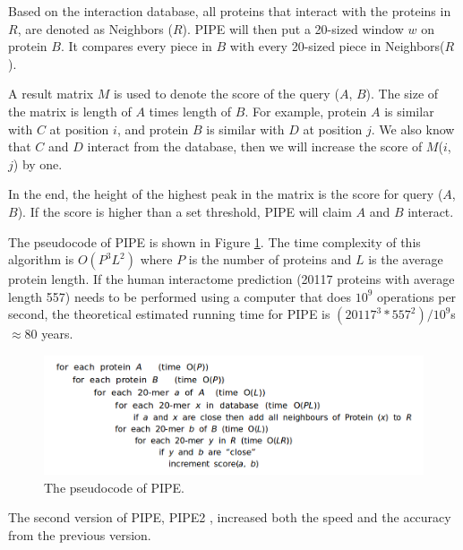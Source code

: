 Based on the interaction database, all proteins that interact with the proteins in $R$, are denoted as Neighbors ($R$). PIPE will then put a 20-sized window $w$ on protein $B$. It compares every piece in $B$ with every 20-sized piece in Neighbors($R$).

A result matrix $M$ is used to denote the score of the query ($A$, $B$). The size of the matrix is length of $A$ times length of $B$. For example, protein $A$ is similar with $C$ at position $i$, and protein $B$ is similar with $D$ at position $j$. We also know that $C$ and $D$ interact from the database, then we will increase the score of $M$($i$, $j$) by one.

In the end, the height of the highest peak in the matrix is the score for query ($A$, $B$). If the score is higher than a set threshold, PIPE will claim $A$ and $B$ interact.

The pseudocode of PIPE is shown in Figure \ref{fig_pseudocode_pipe}. The time complexity of this algorithm is $O(P^3L^2)$ where $P$ is the number of proteins and $L$ is the average protein length. If the human interactome prediction (20117 proteins with average length 557) needs to be performed using a computer that does $10^9$ operations per second, the theoretical estimated running time for PIPE is $(20117^3*557^2)/10^9$s $\approx 80 $ years.  

\begin{figure}[h!]
\begin{center}
\includegraphics[width =17cm]{img/psedo_code_pipe.png}
\caption[The pseudocode of PIPE]{The pseudocode of PIPE.  \label{fig_pseudocode_pipe}}
\end{center}
\end{figure} 

The second version of PIPE, PIPE2 \cite{Pitre08_PIPE2}, increased both the speed and the accuracy from the previous version. 

